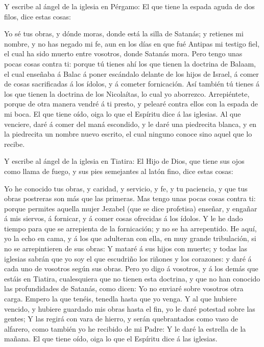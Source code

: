  Y escribe al ángel de la iglesia en Pérgamo: El que tiene
la espada aguda de dos filos, dice estas cosas:

 Yo sé tus obras, y dónde moras, donde está la silla de
Satanás; y retienes mi nombre, y no has negado mi fe, aun en los días en
que fué Antipas mi testigo fiel, el cual ha sido muerto entre vosotros,
donde Satanás mora.  Pero tengo unas pocas cosas contra ti:
porque tú tienes ahí los que tienen la doctrina de Balaam, el cual
enseñaba á Balac á poner escándalo delante de los hijos de Israel, á
comer de cosas sacrificadas á los ídolos, y á cometer fornicación.
 Así también tú tienes á los que tienen la doctrina de los
Nicolaítas, lo cual yo aborrezco.  Arrepiéntete, porque de
otra manera vendré á ti presto, y pelearé contra ellos con la espada de
mi boca.  El que tiene oído, oiga lo que el Espíritu dice á
las iglesias. Al que venciere, daré á comer del maná escondido, y le
daré una piedrecita blanca, y en la piedrecita un nombre nuevo escrito,
el cual ninguno conoce sino aquel que lo recibe.

 Y escribe al ángel de la iglesia en Tiatira: El Hijo de
Dios, que tiene sus ojos como llama de fuego, y sus pies semejantes al
latón fino, dice estas cosas:

 Yo he conocido tus obras, y caridad, y servicio, y fe, y
tu paciencia, y que tus obras postreras son más que las primeras.
 Mas tengo unas pocas cosas contra ti: porque permites
aquella mujer Jezabel (que se dice profetisa) enseñar, y engañar á mis
siervos, á fornicar, y á comer cosas ofrecidas á los ídolos.
 Y le he dado tiempo para que se arrepienta de la
fornicación; y no se ha arrepentido.  He aquí, yo la echo
en cama, y á los que adulteran con ella, en muy grande tribulación, si
no se arrepintieren de sus obras:  Y mataré á sus hijos con
muerte; y todas las iglesias sabrán que yo soy el que escudriño los
riñones y los corazones: y daré á cada uno de vosotros según sus obras.
 Pero yo digo á vosotros, y á los demás que estáis en
Tiatira, cualesquiera que no tienen esta doctrina, y que no han conocido
las profundidades de Satanás, como dicen: Yo no enviaré sobre vosotros
otra carga.  Empero la que tenéis, tenedla hasta que yo
venga.  Y al que hubiere vencido, y hubiere guardado mis
obras hasta el fin, yo le daré potestad sobre las gentes; 
Y las regirá con vara de hierro, y serán quebrantados como vaso de
alfarero, como también yo he recibido de mi Padre:  Y le
daré la estrella de la mañana.  El que tiene oído, oiga lo
que el Espíritu dice á las iglesias.

